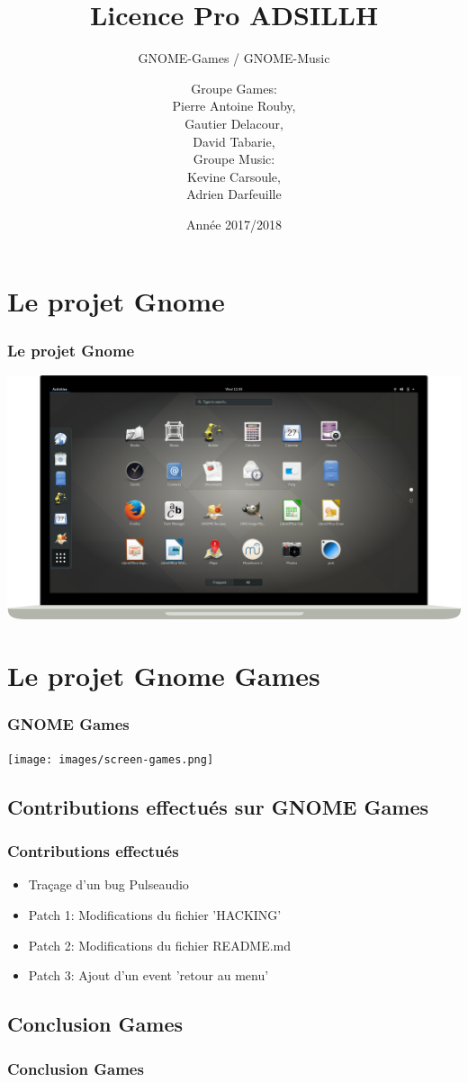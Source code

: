 \documentclass{beamer}
\title{Licence Pro ADSILLH}
\subtitle{GNOME-Games / GNOME-Music}
\author{Groupe Games:\\ Pierre Antoine Rouby,\\ Gautier Delacour,\\
  David Tabarie,\\
  \vspace{0.8cm}
  Groupe Music:\\ Kevine Carsoule,\\ Adrien Darfeuille}
\date{Année 2017/2018}
\begin{document}
\frame{\titlepage}

\section{Le projet Gnome}
\begin{frame}
  \frametitle{Le projet Gnome}
    \includegraphics[scale=0.235]{images/GnomeScreen.png}
\end{frame}

\section{Le projet Gnome Games}
\begin{frame}
  \frametitle{GNOME Games}
  \texttt{[image: images/screen-games.png]}
\end{frame}

\subsection{Contributions effectués sur GNOME Games}
\begin{frame}
  \frametitle{Contributions effectués}
  \begin{itemize}
    \item Traçage d'un bug Pulseaudio
    \item Patch 1: Modifications du fichier 'HACKING'
    \item Patch 2: Modifications du fichier README.md
    \item Patch 3: Ajout d'un event 'retour au menu'
  \end{itemize}
\end{frame}

\subsection{Conclusion Games}
\begin{frame}
  \frametitle{Conclusion Games}
\end{frame}
\end{document}
